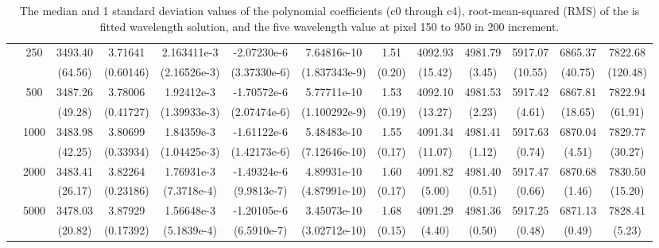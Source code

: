 \documentclass{aa}
\begin{document}
\begin{landscape}
\begin{table}
\begin{tabular}{|c|c|ccccc|c|ccccc|}
              & \multirow{2}{*}{250} & 3493.40  & 3.71641   & 2.163411e-3  & -2.07230e-6  & 7.64816e-10  & 1.51    & 4092.93 & 4981.79 & 5917.07 & 6865.37 & 7822.68\\
              &                      & (64.56)  & (0.60146) & (2.16526e-3) & (3.37330e-6) & (1.837343e-9) & (0.20) & (15.42) & (3.45)  & (10.55) & (40.75) & (120.48)\\\cline{2-13}
              & \multirow{2}{*}{500} & 3487.26  & 3.78006   & 1.92412e-3   & -1.70572e-6  & 5.77711e-10   & 1.53   & 4092.10 & 4981.53 & 5917.42 & 6867.81 & 7822.94\\
              &                      & (49.28)  & (0.41727) & (1.39933e-3) & (2.07474e-6) & (1.100292e-9) & (0.19) & (13.27) & (2.23)  & (4.61)  & (18.65) & (61.91)\\\cline{2-13}
              & \multirow{2}{*}{1000} & 3483.98 & 3.80699   & 1.84359e-3   & -1.61122e-6  & 5.48483e-10   & 1.55   & 4091.34 & 4981.41 & 5917.63 & 6870.04 & 7829.77\\
              &                       & (42.25) & (0.33934) & (1.04425e-3) & (1.42173e-6) & (7.12646e-10) & (0.17) & (11.07) & (1.12)  & (0.74)  & (4.51)  & (30.27)\\\cline{2-13}
              & \multirow{2}{*}{2000} & 3483.41 & 3.82264   & 1.76931e-3   & -1.49324e-6  & 4.89931e-10   & 1.60   & 4091.82 & 4981.40 & 5917.47 & 6870.68 & 7830.50\\
              &                       & (26.17) & (0.23186) & (7.3718e-4)  & (9.9813e-7)  & (4.87991e-10) & (0.17) & (5.00)  & (0.51)  & (0.66)  & (1.46)  & (15.20)\\\cline{2-13}
              & \multirow{2}{*}{5000} & 3478.03 & 3.87929   & 1.56648e-3   & -1.20105e-6  & 3.45073e-10   & 1.68   & 4091.29 & 4981.36 & 5917.25 & 6871.13 & 7828.41\\
              &                       & (20.82) & (0.17392) & (5.1839e-4)  & (6.5910e-7)  & (3.02712e-10) & (0.15) & (4.40)  & (0.50)  & (0.48)  & (0.49)  & (5.23)\\\hline
    \end{tabular}
    \caption{The median and 1 standard deviation values of the polynomial coefficients (c0 through c4), root-mean-squared (RMS) of the is fitted wavelength solution, and the five wavelength value at pixel 150 to 950 in 200 increment.}
    \label{tab:stats}
\end{table}
\end{landscape}
\end{document}
